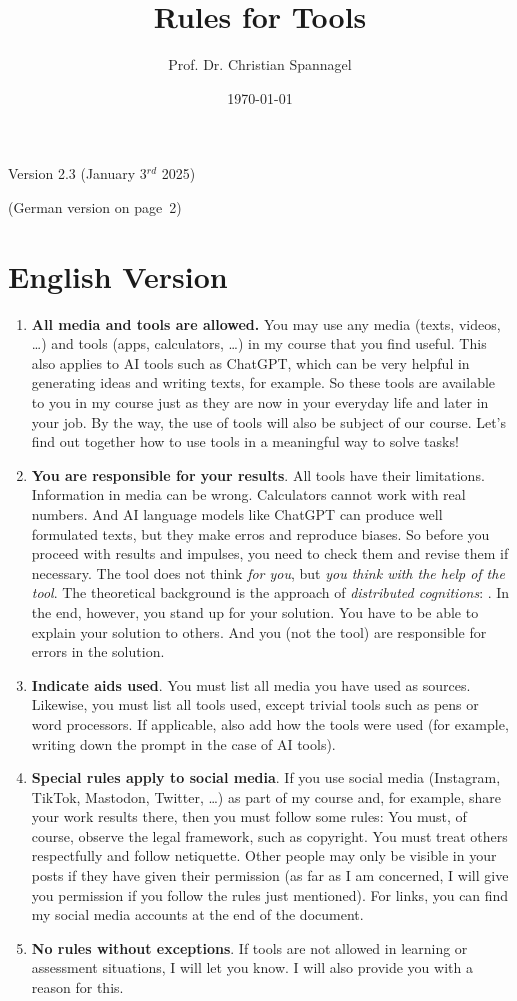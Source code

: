\documentclass{../cssheet}
\title{Rules for Tools}
\author{Prof. Dr. Christian Spannagel}
\date{\today}
\begin{document}
\printtitle
\begin{center}
Version 2.3 (January 3$^{rd}$ 2025)
\end{center}
(German version on page~2)
\section {English Version}
\begin{enumerate}
\item \textbf{All media and tools are allowed.} You may use any media (texts, videos, \ldots) and tools (apps, calculators, \ldots) in my course that you find useful. This also applies to AI tools such as ChatGPT, which can be very helpful in generating ideas and writing texts, for example. So these tools are available to you in my course just as they are now in your everyday life and later in your job. By the way, the use of tools will also be subject of our course. Let's find out together how to use tools in a meaningful way to solve tasks! 
\item \textbf{You are responsible for your results}. All tools have their limitations. Information in media can be wrong. Calculators cannot work with real numbers. And AI language models like ChatGPT can produce well formulated texts, but they make erros and reproduce biases. So before you proceed with results and impulses, you need to check them and revise them if necessary. The tool does not think \emph{for you}, but \emph{you think with the help of the tool}. The theoretical background is the approach of \emph{distributed cognitions}: . In the end, however, you stand up for your solution. You have to be able to explain your solution to others. And you (not the tool) are responsible for errors in the solution. 
\item \textbf{Indicate aids used}. You must list all media you have used as sources. Likewise, you must list all tools used, except trivial tools such as pens or word processors. If applicable, also add how the tools were used (for example, writing down the prompt in the case of AI tools).
\item \textbf{Special rules apply to social media}. If you use social media (Instagram, TikTok, Mastodon, Twitter, \ldots) as part of my course and, for example, share your work results there, then you must follow some rules: You must, of course, observe the legal framework, such as copyright. You must treat others respectfully and follow netiquette. Other people may only be visible in your posts if they have given their permission (as far as I am concerned, I will give you permission if you follow the rules just mentioned). For links, you can find my social media accounts at the end of the document.
\item \textbf{No rules without exceptions}. If tools are not allowed in learning or assessment situations, I will let you know. I will also provide you with a reason for this.
\end{enumerate}
\end{document}
